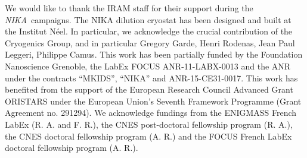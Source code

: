 \documentclass[twocolumn,traditabstract]{aa}
\def\NIKA{\textit{NIKA}}
\begin{document}
\vspace{0.2cm}
 \begin{acknowledgements}
We would like to thank the IRAM staff for their support during the \NIKA\ campaigns. 
The NIKA dilution cryostat has been designed and built at the Institut N\'eel. 
In particular, we acknowledge the crucial contribution of the Cryogenics Group, and 
in particular Gregory Garde, Henri Rodenas, Jean Paul Leggeri, Philippe Camus. 
This work has been partially funded by the Foundation Nanoscience Grenoble, the LabEx FOCUS ANR-11-LABX-0013 and 
the ANR under the contracts ``MKIDS'', ``NIKA'' and ANR-15-CE31-0017. 
This work has benefited from the support of the European Research Council Advanced Grant ORISTARS 
under the European Union's Seventh Framework Programme (Grant Agreement no. 291294).
We acknowledge fundings from the ENIGMASS French LabEx (R. A. and F. R.), 
the CNES post-doctoral fellowship program (R. A.),  the CNES doctoral fellowship program (A. R.) and 
the FOCUS French LabEx doctoral fellowship program (A. R.).
\end{acknowledgements}



\end{document}
